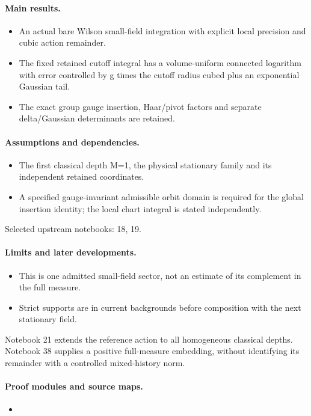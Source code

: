 \paragraph{Main results.}
\begin{itemize}
\item An actual bare Wilson small-field integration with explicit local precision and cubic action remainder.
\item The fixed retained cutoff integral has a volume-uniform connected logarithm with error controlled by g times the cutoff radius cubed plus an exponential Gaussian tail.
\item The exact group gauge insertion, Haar/pivot factors and separate delta/Gaussian determinants are retained.
\end{itemize}

\paragraph{Assumptions and dependencies.}
\begin{itemize}
\item The first classical depth M=1, the physical stationary family and its independent retained coordinates.
\item A specified gauge-invariant admissible orbit domain is required for the global insertion identity; the local chart integral is stated independently.
\end{itemize}

Selected upstream notebooks: 18, 19.\par

\paragraph{Limits and later developments.}
\begin{itemize}
\item This is one admitted small-field sector, not an estimate of its complement in the full measure.
\item Strict supports are in current backgrounds before composition with the next stationary field.
\end{itemize}

Notebook 21 extends the reference action to all homogeneous classical depths. Notebook 38 supplies a positive full-measure embedding, without identifying its remainder with a controlled mixed-history norm.

\paragraph{Proof modules and source maps.}
\begingroup\small
\begin{itemize}
\item {}
\end{itemize}
\endgroup

